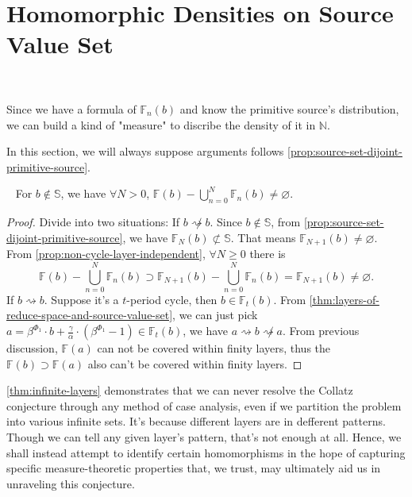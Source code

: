 \section{Homomorphic Densities on Source Value Set}~\label{sec:homomorphic-densities-on-source-value-set}

Since we have a formula of $\mathbb{F}_{n}(b)$ and know the primitive source's distribution, we can build a kind of "measure" to discribe the density of it in $\mathbb{N}$.

In this section, we will always suppose arguments follows \cref{prop:source-set-dijoint-primitive-source}.
\begin{theorem}~\label{thm:infinite-layers}
	For $b\not\in\mathbb{S}$, we have $\forall N > 0$, $\mathbb{F}(b) - \bigcup_{n=0}^{N}\mathbb{F}_{n}(b) \ne \varnothing$.
\end{theorem}
\begin{proof}
	Divide into two situations:\newline
	If $b \not\rightsquigarrow b$. Since $b\not\in\mathbb{S}$, from \cref{prop:source-set-dijoint-primitive-source}, we have $\mathbb{F}_{N}(b) \not\subset \mathbb{S}$. That means $\mathbb{F}_{N + 1}(b) \ne \varnothing$.
	From \cref{prop:non-cycle-layer-independent}, $\forall N \ge 0$ there is
	\[\mathbb{F}(b) - \bigcup_{n=0}^{N}\mathbb{F}_{n}(b) \supset \mathbb{F}_{N+1}(b) - \bigcup_{n=0}^{N}\mathbb{F}_{n}(b) = \mathbb{F}_{N+1}(b) \ne \varnothing.\]
	If $b \rightsquigarrow b$. Suppose it's a $t$-period cycle, then $b \in\mathbb{F}_{t}(b)$. From \cref{thm:layers-of-reduce-space-and-source-value-set}, we can just pick $a = \beta^{\Phi_1}\cdot b + \frac{\gamma}{\alpha}\cdot(\beta^{\Phi_1} - 1)\in\mathbb{F}_{t}(b)$, we have $a \rightsquigarrow b \not\rightsquigarrow a$. From previous discussion, $\mathbb{F}(a)$ can not be covered within finity layers, thus the $\mathbb{F}(b) \supset \mathbb{F}(a)$ also can't be covered within finity layers.
\end{proof}

\cref{thm:infinite-layers} demonstrates that we can never resolve the Collatz conjecture through any method of case analysis, even if we partition the problem into various infinite sets. It's because different layers are in defferent patterns. Though we can tell any given layer's pattern, that's not enough at all. Hence, we shall instead attempt to identify certain homomorphisms in the hope of capturing specific measure-theoretic properties that, we trust, may ultimately aid us in unraveling this conjecture.

